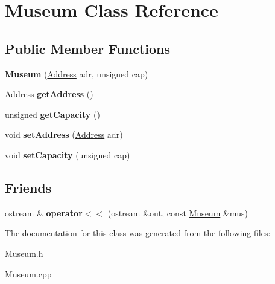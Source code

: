 \hypertarget{classMuseum}{}\section{Museum Class Reference}
\label{classMuseum}
\subsection*{Public Member Functions}
\begin{DoxyCompactItemize}
\item 
\mbox{\label{classMuseum_accff6fb477904f89182a59534aebe30e}} 
{\bfseries Museum} (\hyperlink{classAddress}{Address} adr, unsigned cap)
\item 
\mbox{\label{classMuseum_a9f257cbc8a73d5d9b7b9f1863935f61d}} 
\hyperlink{classAddress}{Address} {\bfseries get\+Address} ()
\item 
\mbox{\label{classMuseum_a44901c9656282c44d3c993037b654c8a}} 
unsigned {\bfseries get\+Capacity} ()
\item 
\mbox{\label{classMuseum_af69a3fc747ce1b4747278f6e82722f09}} 
void {\bfseries set\+Address} (\hyperlink{classAddress}{Address} adr)
\item 
\mbox{\label{classMuseum_a8a3bc77112aa41ab9bfda75d51826412}} 
void {\bfseries set\+Capacity} (unsigned cap)
\end{DoxyCompactItemize}
\subsection*{Friends}
\begin{DoxyCompactItemize}
\item 
\mbox{\label{classMuseum_ad90ceeb3a0c288fafd671619127cbb67}} 
ostream \& {\bfseries operator$<$$<$} (ostream \&out, const \hyperlink{classMuseum}{Museum} \&mus)
\end{DoxyCompactItemize}


The documentation for this class was generated from the following files\+:\begin{DoxyCompactItemize}
\item 
Museum.\+h\item 
Museum.\+cpp\end{DoxyCompactItemize}
